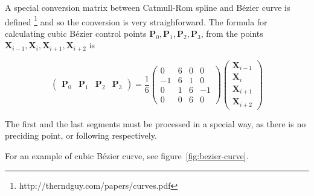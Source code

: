 A special conversion matrix between Catmull-Rom spline and Bézier curve is defined \cite{}\footnote{http://therndguy.com/papers/curves.pdf} and so the conversion is very straighforward. The formula for calculating cubic Bézier control points $ \mathbf{P}_0, \mathbf{P}_1, \mathbf{P}_2, \mathbf{P}_3 $, from the points $ \mathbf{X}_{i-1}, \mathbf{X}_i, \mathbf{X}_{i+1}, \mathbf{X}_{i+2} $ is

$$
\begin{pmatrix}\mathbf{P}_0 & \mathbf{P}_1 & \mathbf{P}_{2} & \mathbf{P}_{3} \end{pmatrix} = \frac{1}{6}\begin{pmatrix} 0 & 6 & 0 & 0 \\ -1 & 6 & 1 & 0 \\ 0 & 1 & 6 & -1 \\ 0 & 0 & 6 & 0 \end{pmatrix} \begin{pmatrix} \mathbf{X}_{i-1} \\ \mathbf{X}_i \\ \mathbf{X}_{i+1} \\ \mathbf{X}_{i+2} \end{pmatrix}
$$

The first and the last segments must be processed in a special way, as there is no preciding point, or following respectively. 

For an example of cubic Bézier curve, see figure~\ref{fig:bezier-curve}.